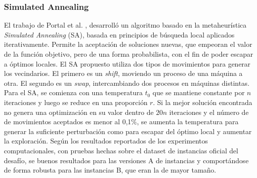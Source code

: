 \subsubsection{Simulated Annealing}

El trabajo de Portal et al. \cite{portal2015sa}, desarrolló un algoritmo basado en la metaheurística \textit{Simulated Annealing} (SA), basada en principios de búsqueda local aplicados iterativamente. Permite la aceptación de soluciones nuevas, que empeoran el valor de la función objetivo, pero de una forma probabilista, con el fin de poder escapar a  óptimos locales. El SA propuesto utiliza dos tipos de movimientos para generar los vecindarios. El primero es un \textit{shift}, moviendo un proceso de una máquina a otra. El segundo es un \textit{swap}, intercambiando dos procesos en máquinas distintas. Para el SA, se comienza con una temperatura $t_0$ que se mantiene constante por $n$ iteraciones y luego se reduce en una proporción $r$. Si la mejor solución encontrada no genera una optimización en su valor dentro de $20n$ iteraciones y el número de de movimientos aceptados es menor al 0,1\%, se aumenta la temperatura para generar la suficiente perturbación como para escapar del óptimo local y aumentar la exploración. Según los resultados reportados de los experimentos computacionales, con pruebas hechas sobre el dataset de instancias oficial del desafío, se buenos resultados  para las versiones A de instancias y comportándose de forma robusta para las instancias B, que eran la de mayor tamaño. 




 

